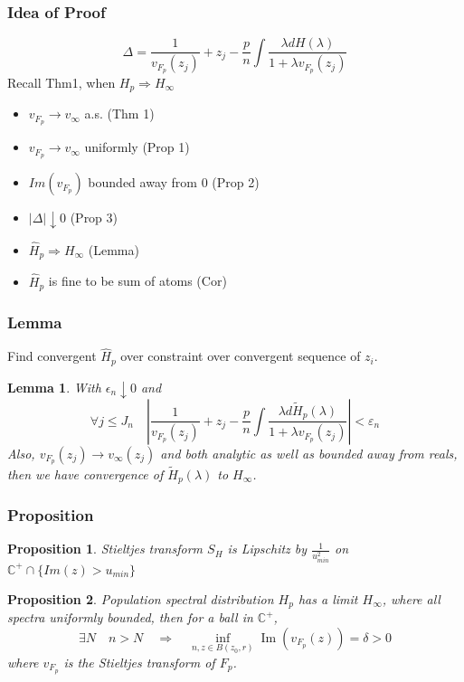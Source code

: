 \documentclass[aspectratio=169, 10pt, utf8, mathserif]{beamer}
\newtheorem{prop}{Proposition}
\newtheorem{lem}{Lemma}
\begin{document}
\begin{frame}
	\frametitle{Idea of Proof}
	$$\Delta =\frac{1}{v_{F_{p}}\left(z_{j}\right)}+z_{j}-\frac{p}{n} \int \frac{\lambda d H(\lambda)}{1+\lambda v_{F_{p}}\left(z_{j}\right)}$$
	Recall Thm1, when $H_p\Rightarrow H_{\infty}$
	\begin{itemize}
	\item $v_{F_p}\to v_{\infty}$ a.s. (Thm 1)
	\item $v_{F_p}\to v_{\infty}$ uniformly (Prop 1)
	\item $Im(v_{F_p})$ bounded away from 0 (Prop 2)
	\item $|\Delta|\downarrow0$ (Prop 3)
	\item $\hat{H}_p\Rightarrow H_{\infty}$ (Lemma)
	\item $\hat{H}_p$ is fine to be sum of atoms (Cor)
	\end{itemize}
\end{frame}
\begin{frame}
	\frametitle{Lemma}
	Find convergent $\hat{H}_p$ over constraint over convergent sequence of $z_i$.\\
	\begin{lem}
	With $\epsilon_n \downarrow 0$ and $$
	\forall j \leq J_{n} \quad\left|\frac{1}{v_{F_{p}}\left(z_{j}\right)}+z_{j}-\frac{p}{n} \int \frac{\lambda d \tilde{H}_{p}(\lambda)}{1+\lambda v_{F_{p}}\left(z_{j}\right)}\right|<\varepsilon_{n}
	$$
	Also, $v_{F_p}(z_j)\to v_{\infty}(z_j) $ and both analytic as well as bounded away from reals, then we have convergence of $\tilde{H}_{p}(\lambda)$ to $H_{\infty}$.
	\end{lem}
\end{frame}

\begin{frame}
	\frametitle{Proposition}
	\begin{prop}
	Stieltjes transform $S_H$ is Lipschitz by $\frac{1}{u_{min}^2}$ on $\mathbb{C}^+\cap\{Im(z)>u_{min}\}$
	\end{prop}
	\begin{prop}
	Population spectral distribution $H_p$ has a limit $H_{\infty}$, where all spectra uniformly bounded, then for a ball in $\mathbb{C}^+$, 
	$$
	\exists N \quad n>N \quad \Rightarrow \quad \inf _{n, z \in B\left(z_{0}, r\right)} \operatorname{Im}\left(v_{F_{p}}(z)\right)=\delta>0
	$$
	where $v_{F_p}$ is the Stieltjes transform of $F_p$.
	\end{prop}
\end{frame}
\end{document}

